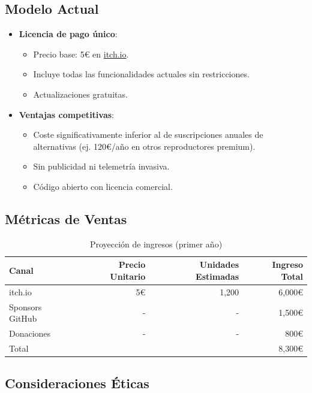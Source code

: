 \documentclass[11pt, a4paper]{article}
\begin{document}
  \subsection{Modelo Actual}

  \begin{itemize}
    \item \textbf{Licencia de pago único}:
      \begin{itemize}
        \item Precio base: 5€ en \href{https://zmiko.itch.io/musy}{itch.io}.
        \item Incluye todas las funcionalidades actuales sin restricciones.
        \item Actualizaciones gratuitas.
      \end{itemize}

    \item \textbf{Ventajas competitivas}:
      \begin{itemize}
        \item Coste significativamente inferior al de suscripciones anuales de alternativas (ej. 120€/año en otros reproductores premium).
        \item Sin publicidad ni telemetría invasiva.
        \item Código abierto con licencia comercial.
      \end{itemize}
  \end{itemize}

  \subsection{Métricas de Ventas}

  \begin{table}[h]
    \centering
    \caption{Proyección de ingresos (primer año)}
    \begin{tabular}{lrrr}
      \hline
      Canal & Precio Unitario & Unidades Estimadas & Ingreso Total \\
      \hline
      itch.io & 5€ & 1,200 & 6,000€ \\
      Sponsors GitHub & - & - & 1,500€ \\
      Donaciones & - & - & 800€ \\
      \hline
      Total & & & 8,300€ \\
      \hline
    \end{tabular}
    \label{tab:ingresos}
  \end{table}

  \subsection{Consideraciones Éticas}
\end{document}
